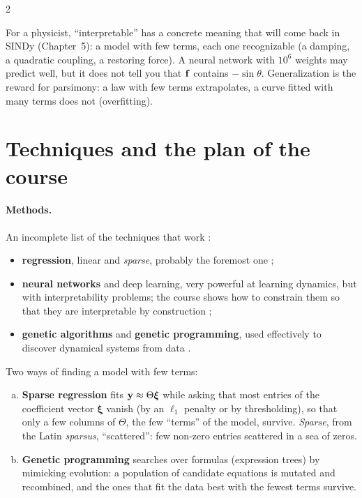 \begin{paracol}{2}
\begin{intuition}[Interpretable = few terms]
For a physicist, ``interpretable'' has a concrete meaning that will come back in SINDy (Chapter~5): a
model with few terms, each one recognizable (a damping, a quadratic coupling, a restoring force). A
neural network with $10^6$ weights may predict well, but it does not tell you that $\mathbf{f}$ contains
$-\sin\theta$. Generalization is the reward for parsimony: a law with few terms extrapolates, a
curve fitted with many terms does not (overfitting).
\end{intuition}

\section{Techniques and the plan of the course}\label{sec:ov-techniques}

\paragraph{Methods.} An incomplete list of the techniques that work :
\begin{itemize}
  \item \textbf{regression}, linear and \emph{sparse}, probably the foremost one ;
  \item \textbf{neural networks} and deep learning, very powerful at learning dynamics, but with
        interpretability problems; the course shows how to constrain them so that they are interpretable
        by construction ;
  \item \textbf{genetic algorithms} and \textbf{genetic programming}, used effectively to discover
        dynamical systems from data .
\end{itemize}

\begin{definition}
Two ways of finding a model with few terms:
\begin{enumerate}[(a)]
  \item \textbf{Sparse regression} fits $\mathbf{y}\approx\Theta\boldsymbol\xi$ while asking that most
        entries of the coefficient vector $\boldsymbol\xi$ vanish (by an $\ell_1$ penalty or by
        thresholding), so that only a few columns of $\Theta$, the few ``terms'' of the model,
        survive. \emph{Sparse}, from the Latin \emph{sparsus}, ``scattered'': few non-zero entries
        scattered in a sea of zeros.
  \item \textbf{Genetic programming} searches over formulas (expression trees) by mimicking evolution:
        a population of candidate equations is mutated and recombined, and the ones that fit the data
        best with the fewest terms survive.
\end{enumerate}
\end{definition}


\end{paracol}
